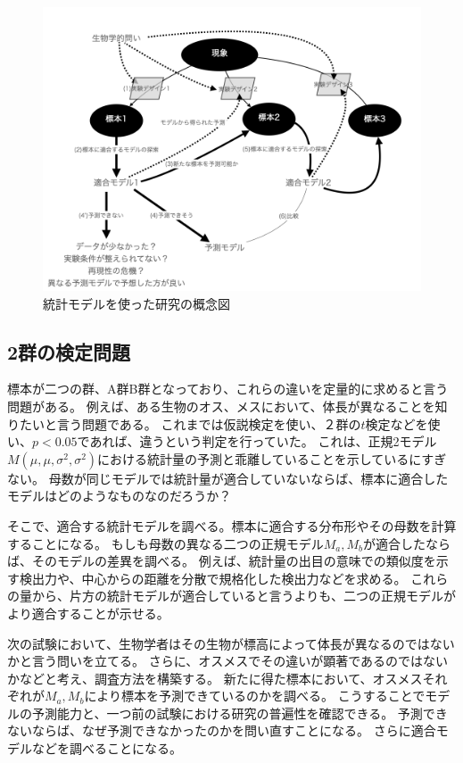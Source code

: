 \begin{figure}
    \begin{center}
        \includegraphics[width=15cm]{./image/01_/conceptual_diagram/conceptual_diagram.006.png}
        \caption{統計モデルを使った研究の概念図}
        \label{fig:conceptual_diagram_statistics_research}
    \end{center}
\end{figure}


\subsection{2群の検定問題}
標本が二つの群、A群B群となっており、これらの違いを定量的に求めると言う問題がある。
例えば、ある生物のオス、メスにおいて、体長が異なることを知りたいと言う問題である。
これまでは仮説検定を使い、２群の$t$検定などを使い、$p<0.05$であれば、違うという判定を行っていた。
これは、正規2モデル$M(\mu,\mu,\sigma^2,\sigma^2)$における統計量の予測と乖離していることを示しているにすぎない。
母数が同じモデルでは統計量が適合していないならば、標本に適合したモデルはどのようなものなのだろうか？

そこで、適合する統計モデルを調べる。標本に適合する分布形やその母数を計算することになる。
もしも母数の異なる二つの正規モデル$M_a,M_b$が適合したならば、そのモデルの差異を調べる。
例えば、統計量の出目の意味での類似度を示す検出力や、中心からの距離を分散で規格化した検出力などを求める。
これらの量から、片方の統計モデルが適合していると言うよりも、二つの正規モデルがより適合することが示せる。

次の試験において、生物学者はその生物が標高によって体長が異なるのではないかと言う問いを立てる。
さらに、オスメスでその違いが顕著であるのではないかなどと考え、調査方法を構築する。
新たに得た標本において、オスメスそれぞれが$M_a,M_b$により標本を予測できているのかを調べる。
こうすることでモデルの予測能力と、一つ前の試験における研究の普遍性を確認できる。
予測できないならば、なぜ予測できなかったのかを問い直すことになる。
さらに適合モデルなどを調べることになる。


